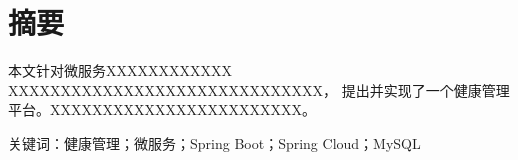\section*{摘\quad 要}

本文针对微服务XXXXXXXXXXXX\\XXXXXXXXXXXXXXXXXXXXXXXXXXXXXX，
提出并实现了一个健康管理平台。XXXXXXXXXXXXXXXXXXXXXXXX。

关键词：健康管理；微服务；Spring Boot；Spring Cloud；MySQL
